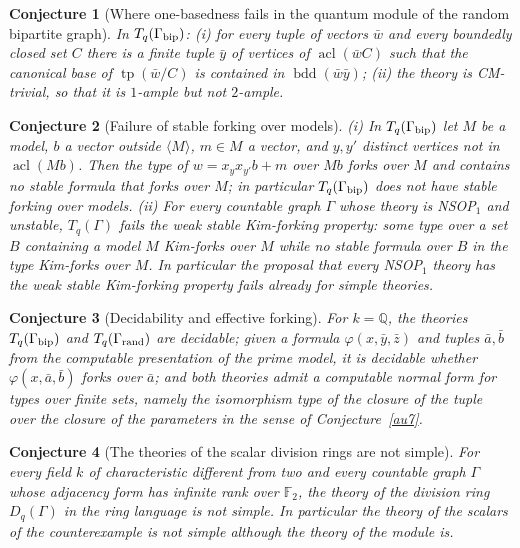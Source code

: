 \documentclass[11pt]{article}
\newtheorem{conjecture}{Conjecture}
\theoremstyle{definition}
\newcommand{\Fq}{\mathbb F}
\newcommand{\Q}{\mathbb Q}
\providecommand{\Q}{\mathbb Q}
\begin{document}
\begin{conjecture}[Where one-basedness fails in the quantum module of the random bipartite graph]\label{au8}
In $T_q(\Gamma_{\rm bip})$:
{\rm(i)} for every tuple of vectors $\bar w$ and every boundedly closed
set $C$ there is a finite tuple $\bar y$ of vertices of
$\operatorname{acl}(\bar wC)$ such that the canonical base of
$\operatorname{tp}(\bar w/C)$ is contained in $\operatorname{bdd}(\bar w\bar y)$;
{\rm(ii)} the theory is CM-trivial, so that it is $1$-ample but not
$2$-ample.
\end{conjecture}


\begin{conjecture}[Failure of stable forking over models]\label{au9}
{\rm(i)} In $T_q(\Gamma_{\rm bip})$ let $M$ be a model, $b$ a vector
outside $\langle M\rangle$, $m\in M$ a vector, and $y,y'$ distinct vertices
not in $\operatorname{acl}(Mb)$.  Then the type of $w=x_yx_{y'}b+m$ over
$Mb$ forks over $M$ and contains no stable formula that forks over $M$; in
particular $T_q(\Gamma_{\rm bip})$ does not have stable forking over
models.
{\rm(ii)} For every countable graph $\Gamma$ whose theory is NSOP$_1$ and
unstable, $T_q(\Gamma)$ fails the weak stable Kim-forking property: some
type over a set $B$ containing a model $M$ Kim-forks over $M$ while no
stable formula over $B$ in the type Kim-forks over $M$.  In particular the
proposal that every NSOP$_1$ theory has the weak stable Kim-forking
property fails already for simple theories.
\end{conjecture}


\begin{conjecture}[Decidability and effective forking]\label{au10}
For $k=\Q$, the theories $T_q(\Gamma_{\rm bip})$ and $T_q(\Gamma_{\rm rand})$
are decidable; given a formula $\varphi(x,\bar y,\bar z)$ and tuples
$\bar a,\bar b$ from the computable presentation of the prime model, it is
decidable whether $\varphi(x,\bar a,\bar b)$ forks over $\bar a$; and both
theories admit a computable normal form for types over finite sets, namely
the isomorphism type of the closure of the tuple over the closure of the
parameters in the sense of Conjecture~\ref{au7}.
\end{conjecture}


\begin{conjecture}[The theories of the scalar division rings are not simple]\label{au11}
For every field $k$ of characteristic different from two and every
countable graph $\Gamma$ whose adjacency form has infinite rank over $\Fq_2$,
the theory of the division ring $D_q(\Gamma)$ in the ring language is not
simple.  In particular the theory of the scalars of the counterexample
is not simple although the theory of the module is.
\end{conjecture}
\end{document}
